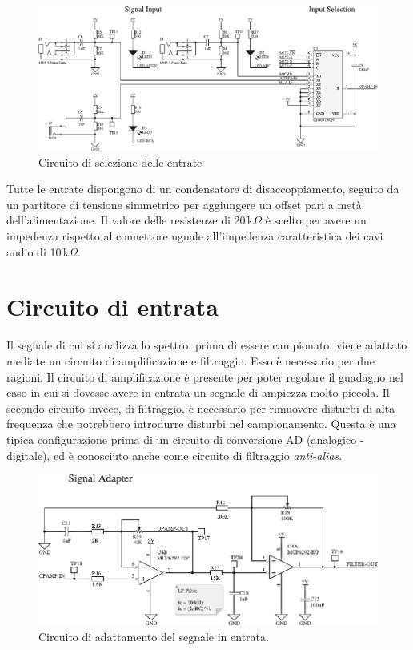 \begin{figure}[H] \centering
    \includegraphics[width=.9\linewidth]{figures/circuits/input-selection-v2.pdf}
    \caption{Circuito di selezione delle entrate \label{fig:input-selection-v2}}
\end{figure}

Tutte le entrate dispongono di un condensatore di disaccoppiamento, seguito da
un partitore di tensione simmetrico per aggiungere un offset pari a met\`a
dell'alimentazione. Il valore delle resistenze di 20\,k\(\Omega\) \`e scelto
per avere un impedenza rispetto al connettore uguale all'impedenza
caratteristica dei cavi audio di 10\,k\(\Omega\).

\section{Circuito di entrata}
Il segnale di cui si analizza lo spettro, prima di essere campionato, viene
adattato mediate un circuito di amplificazione e filtraggio. Esso \`e
necessario per due ragioni. Il circuito di amplificazione \`e presente per
poter regolare il guadagno nel caso in cui si dovesse avere in entrata un
segnale di ampiezza molto piccola. Il secondo circuito invece, di filtraggio,
\`e necessario per rimuovere disturbi di alta frequenza che potrebbero
introdurre disturbi nel campionamento. Questa \`e una tipica configurazione
prima di un circuito di conversione AD (analogico - digitale), ed \`e
conosciuto anche come circuito di filtraggio \emph{anti-alias}.

\begin{figure}[H] \centering
    \includegraphics[width=.9\linewidth]{figures/circuits/filter-ampl-v2.pdf}
    \caption[Circuito di adattamento del segnale]{
        Circuito di adattamento del segnale in entrata.
        \label{fig:filter-ampl-v2}
    }
\end{figure}


